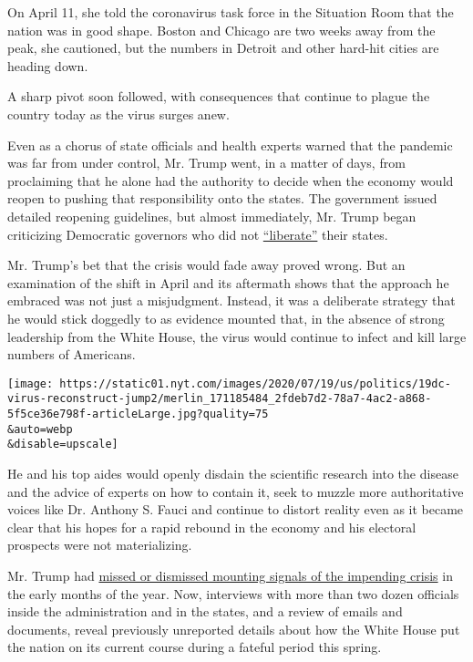 On April 11, she told the coronavirus task force in the Situation Room
that the nation was in good shape. Boston and Chicago are two weeks away
from the peak, she cautioned, but the numbers in Detroit and other
hard-hit cities are heading down.

A sharp pivot soon followed, with consequences that continue to plague
the country today as the virus surges anew.

Even as a chorus of state officials and health experts warned that the
pandemic was far from under control, Mr. Trump went, in a matter of
days, from proclaiming that he alone had the authority to decide when
the economy would reopen to pushing that responsibility onto the states.
The government issued detailed reopening guidelines, but almost
immediately, Mr. Trump began criticizing Democratic governors who did
not
\href{https://twitter.com/realDonaldTrump/status/1251169217531056130?s=20}{``liberate''}
their states.

Mr. Trump's bet that the crisis would fade away proved wrong. But an
examination of the shift in April and its aftermath shows that the
approach he embraced was not just a misjudgment. Instead, it was a
deliberate strategy that he would stick doggedly to as evidence mounted
that, in the absence of strong leadership from the White House, the
virus would continue to infect and kill large numbers of Americans.

\texttt{[image: https://static01.nyt.com/images/2020/07/19/us/politics/19dc-virus-reconstruct-jump2/merlin\_171185484\_2fdeb7d2-78a7-4ac2-a868-5f5ce36e798f-articleLarge.jpg?quality=75\\\&auto=webp\\\&disable=upscale]}

He and his top aides would openly disdain the scientific research into
the disease and the advice of experts on how to contain it, seek to
muzzle more authoritative voices like Dr. Anthony S. Fauci and continue
to distort reality even as it became clear that his hopes for a rapid
rebound in the economy and his electoral prospects were not
materializing.

Mr. Trump had
\href{https://www.nytimes.com/2020/04/11/us/politics/coronavirus-trump-response.html}{missed
or dismissed mounting signals of the impending crisis} in the early
months of the year. Now, interviews with more than two dozen officials
inside the administration and in the states, and a review of emails and
documents, reveal previously unreported details about how the White
House put the nation on its current course during a fateful period this
spring.

